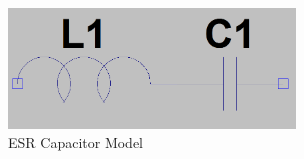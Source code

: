 \begin{figure}
\includegraphics[keepaspectratio=true,width=3in]{./figures/parameters/esrModel.png}
\centering
\caption{ESR Capacitor Model}
\label{esrModel}
\end{figure}
